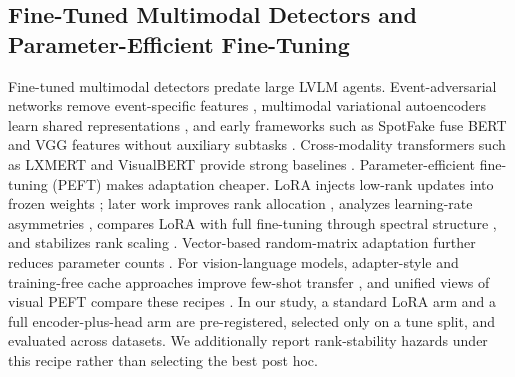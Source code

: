 \documentclass{article} %
\begin{document}
\subsection{Fine-Tuned Multimodal Detectors and Parameter-Efficient Fine-Tuning}
Fine-tuned multimodal detectors predate large LVLM agents. Event-adversarial networks remove event-specific features \citep{Wang2018EannEvent}, multimodal variational autoencoders learn shared representations \citep{Khattar2019MvaeMultimodal}, and early frameworks such as SpotFake fuse BERT and VGG features without auxiliary subtasks \citep{Singhal2019SpotfakeMultimodal}. Cross-modality transformers such as LXMERT and VisualBERT provide strong baselines \citep{Tan2019LxmertLearning, Li2019VisualbertSimple}. Parameter-efficient fine-tuning (PEFT) makes adaptation cheaper. LoRA injects low-rank updates into frozen weights \citep{Hu2021LoraLowrank}; later work improves rank allocation \citep{Zhang2023AdaloraAdaptive}, analyzes learning-rate asymmetries \citep{Hayou2024LoraEfficient}, compares LoRA with full fine-tuning through spectral structure \citep{Shuttleworth2024LoraVs}, and stabilizes rank scaling \citep{Kalajdzievski2023RankStabilization}. Vector-based random-matrix adaptation further reduces parameter counts \citep{Kopiczko2023VeraVectorbased}. For vision-language models, adapter-style and training-free cache approaches improve few-shot transfer \citep{Gao2021ClipadapterBetter, Zhang2022TipadapterTrainingfree}, and unified views of visual PEFT compare these recipes \citep{Yu2022TowardsUnified}. In our study, a standard LoRA arm and a full encoder-plus-head arm are pre-registered, selected only on a tune split, and evaluated across datasets. We additionally report rank-stability hazards under this recipe rather than selecting the best post hoc.
\end{document}
